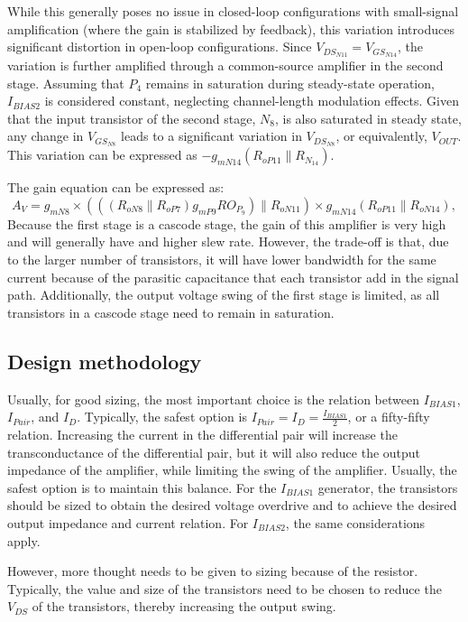 \documentclass[12pt]{article}
\begin{document}
While this generally poses no issue in closed-loop configurations with small-signal amplification (where the gain is stabilized by feedback), this variation introduces significant distortion in open-loop configurations. Since $V_{DS_{N11}} = V_{GS_{N14}}$, the variation is further amplified through a common-source amplifier in the second stage. Assuming that $P_4$ remains in saturation during steady-state operation, $I_{BIAS2}$ is considered constant, neglecting channel-length modulation effects. Given that the input transistor of the second stage, $N_8$, is also saturated in steady state, any change in $V_{GS_{N8}}$ leads to a significant variation in $V_{DS_{N8}}$, or equivalently, $V_{OUT}$. This variation can be expressed as $-g_{mN14}(R_{oP11} \parallel R_{N_{14}})$. 

The gain equation can be expressed as: \[ A_{V} = g_{mN8} \times \left( ((R_{oN8} \parallel R_{oP7}) g_{mP9} RO_{P_{9}}) \parallel R_{oN11} \right) \times g_{mN14} (R_{oP11} \parallel R_{oN14}), \] Because the first stage is a cascode stage, the gain of this amplifier is very high and will generally have and higher slew rate. However, the trade-off is that, due to the larger number of transistors, it will have lower bandwidth for the same current because of the parasitic capacitance that each transistor add in the signal path. Additionally, the output voltage swing of the first stage is limited, as all transistors in a cascode stage need to remain in saturation.

\subsection{Design methodology}
Usually, for good sizing, the most important choice is the relation between $I_{BIAS1}$, $I_{Pair}$, and $I_D$. Typically, the safest option is $I_{Pair} = I_D = \frac{I_{BIAS1}}{2}$, or a fifty-fifty relation. Increasing the current in the differential pair will increase the transconductance of the differential pair, but it will also reduce the output impedance of the amplifier, while limiting the swing of the amplifier. Usually, the safest option is to maintain this balance. For the $I_{BIAS1}$ generator, the transistors should be sized to obtain the desired voltage overdrive and to achieve the desired output impedance and current relation. For $I_{BIAS2}$, the same considerations apply. 

However, more thought needs to be given to sizing because of the resistor. Typically, the value and size of the transistors need to be chosen to reduce the $V_{DS}$ of the transistors, thereby increasing the output swing.
\end{document}
